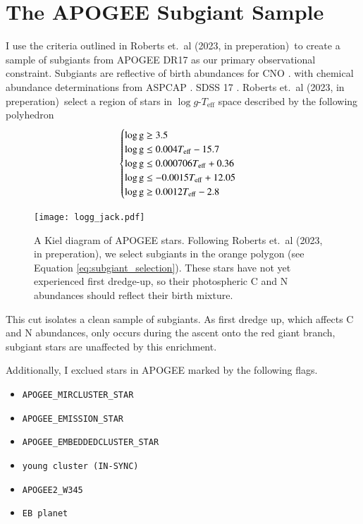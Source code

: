 \documentclass[12pt,oneside]{report}
\newcommand{\citetjack}{Roberts et.\ al (2023, in preperation)}
\begin{document}
\section{The APOGEE Subgiant Sample}\label{sec:jack}

I use the criteria outlined in \citetjack~to create a sample of subgiants from APOGEE DR17 \cite{apogee17} as our primary observational constraint. Subgiants are reflective of birth abundances for CNO \citep{souto19}. with chemical abundance determinations from ASPCAP \citep{aspcap}. SDSS 17 \cite{sdss17}.
\citetjack~select a region of stars in $\log g$-$T_\text{eff}$ space described by the following polyhedron
\begin{equation}
    \begin{cases} \label{eq:subgiant_selection}
        \log \text{g} \geq 3.5 \\
        \log \text{g} \leq 0.004T_{\rm eff} - 15.7 \\
        \log \text{g} \leq 0.000706T_{\rm eff} + 0.36 \\
        \log \text{g} \leq -0.0015T_{\rm eff} + 12.05 \\
        \log \text{g} \geq 0.0012T_{\rm eff} - 2.8 \\
    \end{cases}
\end{equation}

\begin{figure}
    \centering
    \texttt{[image: logg\_jack.pdf]}
    \caption[Subgiant selection]{
        A Kiel diagram of APOGEE stars. Following \citetjack, we select subgiants in the orange polygon (see Equation \ref{eq:subgiant_selection}). These stars have not yet experienced first dredge-up, so their photospheric C and N abundances should reflect their birth mixture.
    }
\end{figure}

This cut isolates a clean sample of subgiants. As first dredge up, which affects C and N abundances, only occurs during the ascent onto the red giant branch, subgiant stars are unaffected by this enrichment. 

Additionally, I exclued stars in APOGEE marked by the following flags.
\begin{itemize}
\item \verb|APOGEE_MIRCLUSTER_STAR|
\item \verb|APOGEE_EMISSION_STAR|
\item \verb|APOGEE_EMBEDDEDCLUSTER_STAR|
\item \verb|young cluster (IN-SYNC)|
\item \verb|APOGEE2_W345|
\item \verb|EB planet|
\end{itemize}
\end{document}
